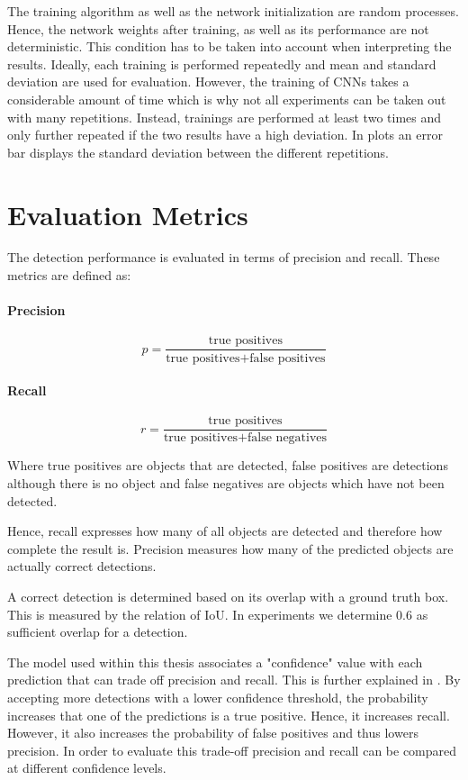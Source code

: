 The training algorithm as well as the network initialization are random processes. Hence, the network weights after training, as well as its performance are not deterministic. This condition has to be taken into account when interpreting the results. Ideally, each training is performed repeatedly and mean and standard deviation are used for evaluation. However, the training of \acp{CNN} takes a considerable amount of time which is why not all experiments can be taken out with many repetitions. Instead, trainings are performed at least two times and only further repeated if the two results have a high deviation. In plots an error bar displays the standard deviation between the different repetitions.


\section{Evaluation Metrics}
\label{sec:background:metrics}
The detection performance is evaluated in terms of precision and recall. These metrics are defined as:

\paragraph{Precision}
$$p = \frac{\text{true positives}}{\text{true positives} + \text{false positives}}$$

\paragraph{Recall}
$$r = \frac{\text{true positives}}{\text{true positives} + \text{false negatives}}$$

Where true positives are objects that are detected, false positives are detections although there is no object and false negatives are objects which have not been detected.

Hence, recall expresses how many of all objects are detected and therefore how complete the result is. Precision measures how many of the predicted objects are actually correct detections.

A correct detection is determined based on its overlap with a ground truth box. This is measured by the relation of \ac{IoU}. In experiments we determine 0.6 as sufficient overlap for a detection. 

The model used within this thesis associates a "confidence" value with each prediction that can trade off precision and recall. This is further explained in . By accepting more detections with a lower confidence threshold, the probability increases that one of the predictions is a true positive. Hence, it increases recall. However, it also increases the probability of false positives and thus lowers precision. In order to evaluate this trade-off precision and recall can be compared at different confidence levels.

